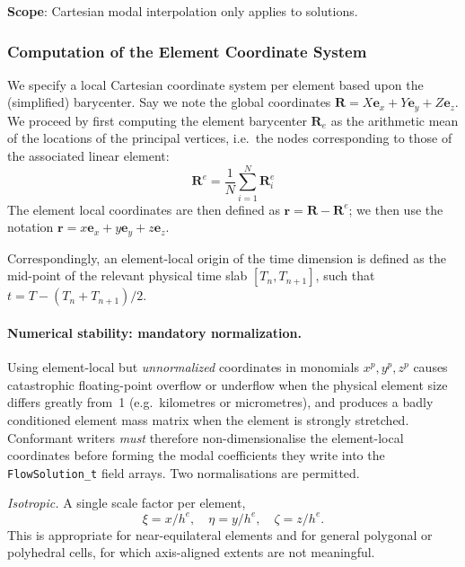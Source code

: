 \documentclass[11pt,letterpaper]{article}
\newenvironment{v2quote}
  {\begin{v2quoteframe}%
   \noindent{\footnotesize\sffamily\bfseries\color{cgnsblue}v2 text}%
   \nopagebreak\par\nopagebreak\vspace{0.15em}}
  {\end{v2quoteframe}}
\begin{document}
\begin{v2quote}
\textbf{Scope}: Cartesian modal interpolation only applies to solutions.
\end{v2quote}

\subsubsection{Computation of the Element Coordinate System}

\begin{v2quote}
We specify a local Cartesian coordinate system per element based upon the (simplified) barycenter.
Say we note the global coordinates $\mathbf{R} = X\mathbf{e}_x + Y\mathbf{e}_y + Z\mathbf{e}_z$.
We proceed by first computing the element barycenter $\mathbf{R}_e$ as the arithmetic mean of the
locations of the principal vertices, i.e.\ the nodes corresponding to those of the associated
linear element:
%
\begin{equation}
  \mathbf{R}^e = \frac{1}{N} \sum_{i=1}^{N} \mathbf{R}_i^e
\end{equation}
%
The element local coordinates are then defined as $\mathbf{r} = \mathbf{R} - \mathbf{R}^e$;
we then use the notation $\mathbf{r} = x\mathbf{e}_x + y\mathbf{e}_y + z\mathbf{e}_z$.

Correspondingly, an element-local origin of the time dimension is defined as the mid-point of the
relevant physical time slab $[T_n, T_{n+1}]$, such that
$t = T - (T_n + T_{n+1})/2$.
\end{v2quote}

\paragraph{Numerical stability: mandatory normalization.}
Using element-local but \emph{unnormalized} coordinates in monomials $x^p, y^p, z^p$
causes catastrophic floating-point overflow or underflow when the physical element
size differs greatly from~1 (e.g.\ kilometres or micrometres), and produces a badly
conditioned element mass matrix when the element is strongly stretched.  Conformant
writers \emph{must} therefore non-dimensionalise the element-local coordinates before
forming the modal coefficients they write into the \texttt{FlowSolution\_t} field
arrays.  Two normalisations are permitted.

\smallskip\noindent\textit{Isotropic.}  A single scale factor per element,
\begin{equation}
  \xi = x/h^e, \quad \eta = y/h^e, \quad \zeta = z/h^e .
\end{equation}
This is appropriate for near-equilateral elements and for general polygonal or
polyhedral cells, for which axis-aligned extents are not meaningful.
\end{document}
